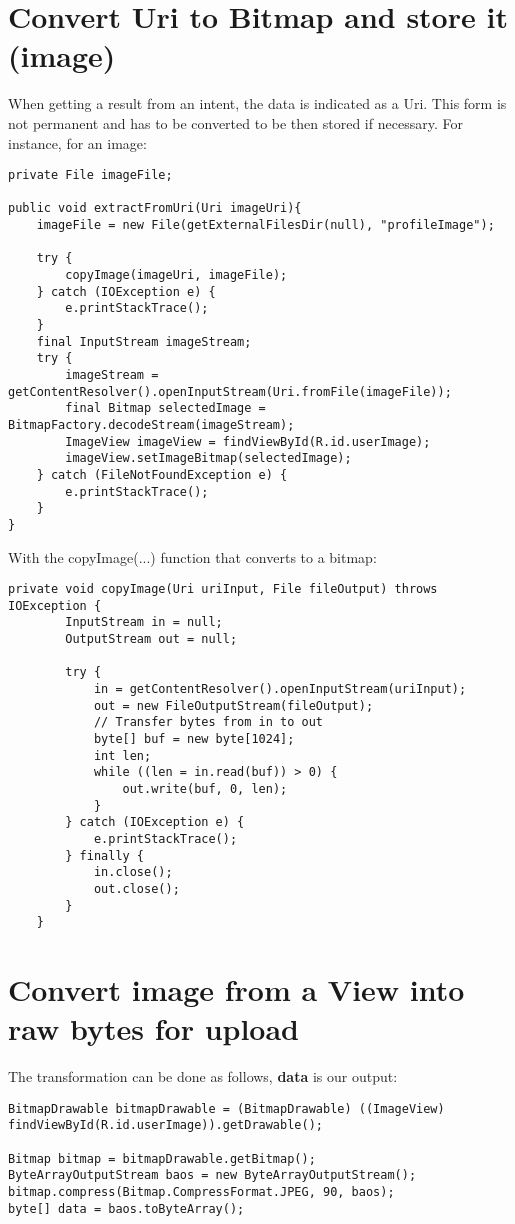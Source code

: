 \documentclass[11pt]{article}
\begin{document}
\section{Convert Uri to Bitmap and store it (image)}
When getting a result from an intent, the data is indicated as a Uri. This form is not permanent and has to be converted to be then stored if necessary. For instance, for an image: 
\lstset{language = Java}
\begin{lstlisting}
private File imageFile;

public void extractFromUri(Uri imageUri){
    imageFile = new File(getExternalFilesDir(null), "profileImage");
    
    try {
        copyImage(imageUri, imageFile);
    } catch (IOException e) {
        e.printStackTrace();
    }
    final InputStream imageStream;
    try {
        imageStream = getContentResolver().openInputStream(Uri.fromFile(imageFile));
        final Bitmap selectedImage = BitmapFactory.decodeStream(imageStream);
        ImageView imageView = findViewById(R.id.userImage);
        imageView.setImageBitmap(selectedImage);
    } catch (FileNotFoundException e) {
        e.printStackTrace();
    }
}
\end{lstlisting}
With the copyImage(...) function that converts to a bitmap:
\lstset{language = Java}
\begin{lstlisting}
private void copyImage(Uri uriInput, File fileOutput) throws IOException {
        InputStream in = null;
        OutputStream out = null;

        try {
            in = getContentResolver().openInputStream(uriInput);
            out = new FileOutputStream(fileOutput);
            // Transfer bytes from in to out
            byte[] buf = new byte[1024];
            int len;
            while ((len = in.read(buf)) > 0) {
                out.write(buf, 0, len);
            }
        } catch (IOException e) {
            e.printStackTrace();
        } finally {
            in.close();
            out.close();
        }
    }
\end{lstlisting}


\section{Convert image from a View into raw bytes for upload}
\label{section:image to raw bytes}
The transformation can be done as follows, \textbf{data} is our output: 
\lstset{language = Java}
\begin{lstlisting}
BitmapDrawable bitmapDrawable = (BitmapDrawable) ((ImageView) findViewById(R.id.userImage)).getDrawable();

Bitmap bitmap = bitmapDrawable.getBitmap();
ByteArrayOutputStream baos = new ByteArrayOutputStream();
bitmap.compress(Bitmap.CompressFormat.JPEG, 90, baos);
byte[] data = baos.toByteArray();
\end{lstlisting}
\end{document}
